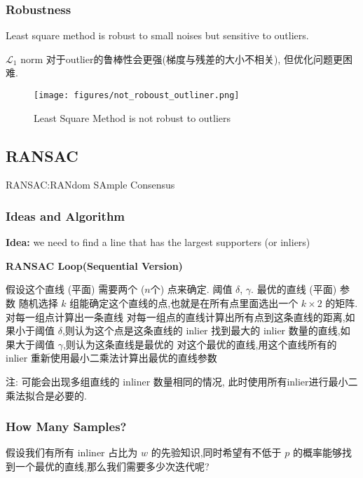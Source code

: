 \subsubsection{Robustness}
Least square method is robust to small noises but sensitive to outliers.

$\mathcal{L}_1$ norm 对于outlier的鲁棒性会更强(梯度与残差的大小不相关), 但优化问题更困难.
\begin{figure}[htbp]
    \centering
    \texttt{[image: figures/not\_roboust\_outliner.png]}
    \caption{Least Square Method is not robust to outliers}
\end{figure}


\subsection{RANSAC}

RANSAC:RANdom SAmple Consensus
\subsubsection{Ideas and Algorithm}
\textbf{Idea:} we need to ﬁnd a line that has the largest supporters (or inliers)
\begin{algo}
    \centering 
    \caption{\textbf{RANSAC Loop(Sequential Version)}}
    \begin{algorithmic}[1]
        \Require 假设这个直线 (平面) 需要两个 ($n$个) 点来确定. 阈值 $\delta$, $\gamma$.
        \Ensure 最优的直线 (平面) 参数
        \State 随机选择 $k$ 组能确定这个直线的点,也就是在所有点里面选出一个 $k\times 2$ 的矩阵.
        \State 对每一组点计算出一条直线
        \State 对每一组点的直线计算出所有点到这条直线的距离,如果小于阈值 $\delta$,则认为这个点是这条直线的 inlier
        \State 找到最大的 inlier 数量的直线,如果大于阈值 $\gamma$,则认为这条直线是最优的
        \State 对这个最优的直线,用这个直线所有的 inlier 重新使用最小二乘法计算出最优的直线参数 
    \end{algorithmic}
\end{algo}
{\kaishu 注: 可能会出现多组直线的 inliner 数量相同的情况, 此时使用所有inlier进行最小二乘法拟合是必要的.}

\subsubsection{How Many Samples?}

假设我们有所有 inliner 占比为 $w$ 的先验知识,同时希望有不低于 $p$ 的概率能够找到一个最优的直线,那么我们需要多少次迭代呢?

